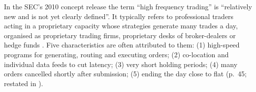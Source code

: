 \begin{qfdefinition}\label{def:hft-strategies}
 In the SEC's 2010 concept release the term ``high frequency trading'' is ``relatively new and is not yet clearly defined''. It typically refers to professional traders acting in a proprietary capacity whose strategies generate many trades a day, organised as proprietary trading firms, proprietary desks of broker-dealers or hedge funds \citep[sec.~IV.B, p.~45]{sec-concept-release-2010}. Five characteristics are often attributed to them: (1) high-speed programs for generating, routing and executing orders; (2) co-location and individual data feeds to cut latency; (3) very short holding periods; (4) many orders cancelled shortly after submission; (5) ending the day close to flat (p.~45; restated in \citep[sec.~2.4.3, p.~163]{alpha-laruelle}).


\end{qfdefinition}
